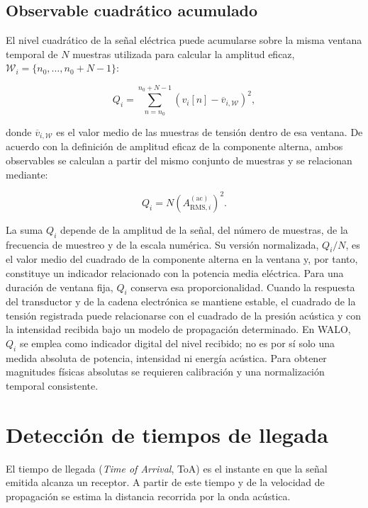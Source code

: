 \subsection*{Observable cuadrático acumulado}

El nivel cuadrático de la señal eléctrica puede acumularse sobre la
misma ventana temporal de $N$ muestras utilizada para calcular la
amplitud eficaz,
$\mathcal{W}_i=\{n_0,\ldots,n_0+N-1\}$:

\begin{equation}
    Q_i
    =
    \sum_{n=n_0}^{n_0+N-1}
    \left(
        v_i[n]-\overline{v}_{i,\mathcal{W}}
    \right)^2,
    \label{eq:observable_cuadratico}
\end{equation}

donde $\overline{v}_{i,\mathcal{W}}$ es el valor medio de las muestras
de tensión dentro de esa ventana. De acuerdo con la definición de
amplitud eficaz de la componente alterna, ambos observables se calculan
a partir del mismo conjunto de muestras y se relacionan mediante:

\begin{equation}
    Q_i=N\left(A_{\mathrm{RMS},i}^{(\mathrm{ac})}\right)^2.
    \label{eq:relacion_cuadratico_rms}
\end{equation}

La suma $Q_i$ depende de la amplitud de la señal, del número de muestras,
de la frecuencia de muestreo y de la escala numérica. Su versión
normalizada, $Q_i/N$, es el valor medio del cuadrado de la componente
alterna en la ventana y, por tanto, constituye un indicador relacionado
con la potencia media eléctrica. Para una duración de ventana fija,
$Q_i$ conserva esa proporcionalidad. Cuando la respuesta
del transductor y de la cadena electrónica se mantiene estable, el
cuadrado de la tensión registrada puede relacionarse con el cuadrado de
la presión acústica y con la intensidad recibida bajo un modelo de
propagación determinado. En WALO, $Q_i$ se emplea como indicador digital
del nivel recibido; no es por sí solo una medida absoluta de potencia,
intensidad ni energía acústica. Para obtener magnitudes físicas
absolutas se requieren calibración y una normalización temporal
consistente.

\section{Detección de tiempos de llegada}

El tiempo de llegada (\textit{Time of Arrival}, ToA) es el instante
en que la señal emitida alcanza un receptor. A partir de este tiempo
y de la velocidad de propagación se estima la distancia recorrida
por la onda acústica.

